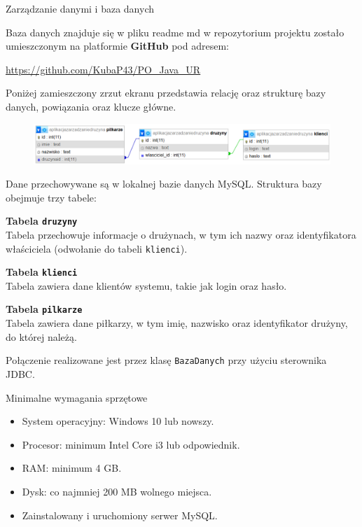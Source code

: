 \documentclass{urdpl}     %
\begin{document}
Zarządzanie danymi i baza danych

Baza danych znajduje się w pliku readme md w repozytorium projektu zostało umieszczonym na platformie \textbf{GitHub} pod adresem:


\begin{center}
\hypersetup{
    colorlinks=true,
    linkcolor=black,
    urlcolor=black
}
    \url{https://github.com/KubaP43/PO_Java_UR}
\end{center}

Poniżej zamieszczony zrzut ekranu przedstawia relację oraz strukturę bazy danych, powiązania oraz klucze główne.

\vspace{1em}

\begin{figure}[H]
\centering
\includegraphics[width=0.75\linewidth]{erd.png}
\label{fig:erd}
\end{figure}

Dane przechowywane są w lokalnej bazie danych MySQL. Struktura bazy obejmuje trzy tabele:\\

\vspace{1em}

\textbf{Tabela \texttt{druzyny}} \\
Tabela przechowuje informacje o drużynach, w tym ich nazwy oraz identyfikatora właściciela (odwołanie do tabeli \texttt{klienci}).

\vspace{1em}

\textbf{Tabela \texttt{klienci}} \\
Tabela zawiera dane klientów systemu, takie jak login oraz hasło.

\vspace{1em}

\textbf{Tabela \texttt{pilkarze}} \\
Tabela zawiera dane piłkarzy, w tym imię, nazwisko oraz identyfikator drużyny, do której należą.


Połączenie realizowane jest przez klasę \texttt{BazaDanych} przy użyciu sterownika JDBC.

Minimalne wymagania sprzętowe

\begin{itemize}
  \item System operacyjny: Windows 10 lub nowszy.
  \item Procesor: minimum Intel Core i3 lub odpowiednik.
  \item RAM: minimum 4 GB.
  \item Dysk: co najmniej 200 MB wolnego miejsca.
  \item Zainstalowany i uruchomiony serwer MySQL.
\end{itemize}
\end{document}

